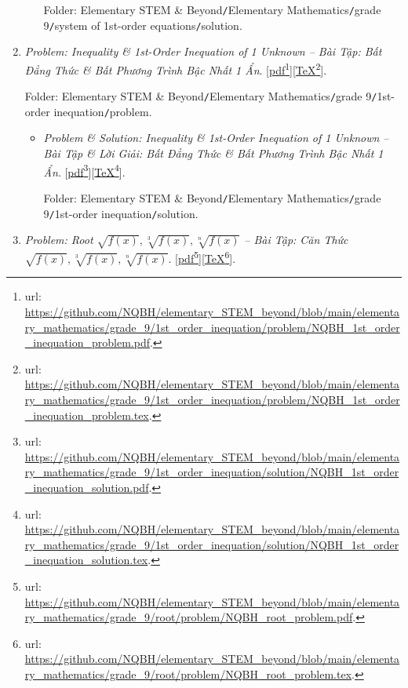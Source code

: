 \documentclass[12pt,twoside]{book}
\begin{document}
\begin{enumerate}
\begin{itemize}
		Folder: {\sf Elementary STEM \& Beyond{\tt/}Elementary Mathematics{\tt/}grade 9{\tt/}system of 1st-order equations{\tt/}solution}.
	\end{itemize}
	\item {\it Problem: Inequality \& 1st-Order Inequation of 1 Unknown -- Bài Tập: Bất Đẳng Thức \& Bất Phương Trình Bậc Nhất 1 Ẩn}. [\href{https://github.com/NQBH/elementary_STEM_beyond/blob/main/elementary_mathematics/grade_9/1st_order_inequation/problem/NQBH_1st_order_inequation_problem.pdf}{pdf}\footnote{{\sc url}: \url{https://github.com/NQBH/elementary_STEM_beyond/blob/main/elementary_mathematics/grade_9/1st_order_inequation/problem/NQBH_1st_order_inequation_problem.pdf}.}][\href{https://github.com/NQBH/elementary_STEM_beyond/blob/main/elementary_mathematics/grade_9/1st_order_inequation/problem/NQBH_1st_order_inequation_problem.tex}{\TeX}\footnote{{\sc url}: \url{https://github.com/NQBH/elementary_STEM_beyond/blob/main/elementary_mathematics/grade_9/1st_order_inequation/problem/NQBH_1st_order_inequation_problem.tex}.}].
	
	Folder: {\sf Elementary STEM \& Beyond{\tt/}Elementary Mathematics{\tt/}grade 9{\tt/}1st-order inequation{\tt/}problem}.
	\begin{itemize}
		\item {\it Problem \& Solution: Inequality \& 1st-Order Inequation of 1 Unknown -- Bài Tập \& Lời Giải: Bất Đẳng Thức \& Bất Phương Trình Bậc Nhất 1 Ẩn}. [\href{https://github.com/NQBH/elementary_STEM_beyond/blob/main/elementary_mathematics/grade_9/1st_order_inequation/solution/NQBH_1st_order_inequation_solution.pdf}{pdf}\footnote{{\sc url}: \url{https://github.com/NQBH/elementary_STEM_beyond/blob/main/elementary_mathematics/grade_9/1st_order_inequation/solution/NQBH_1st_order_inequation_solution.pdf}.}][\href{https://github.com/NQBH/elementary_STEM_beyond/blob/main/elementary_mathematics/grade_9/1st_order_inequation/solution/NQBH_1st_order_inequation_solution.tex}{\TeX}\footnote{{\sc url}: \url{https://github.com/NQBH/elementary_STEM_beyond/blob/main/elementary_mathematics/grade_9/1st_order_inequation/solution/NQBH_1st_order_inequation_solution.tex}.}].
		
		Folder: {\sf Elementary STEM \& Beyond{\tt/}Elementary Mathematics{\tt/}grade 9{\tt/}1st-order inequation{\tt/}solution}.
	\end{itemize}
	\item {\it Problem: Root $\sqrt{f(x)},\sqrt[3]{f(x)},\sqrt[n]{f(x)}$ -- Bài Tập: Căn Thức $\sqrt{f(x)},\sqrt[3]{f(x)},\sqrt[n]{f(x)}$}. [\href{https://github.com/NQBH/elementary_STEM_beyond/blob/main/elementary_mathematics/grade_9/root/problem/NQBH_root_problem.pdf}{pdf}\footnote{{\sc url}: \url{https://github.com/NQBH/elementary_STEM_beyond/blob/main/elementary_mathematics/grade_9/root/problem/NQBH_root_problem.pdf}.}][\href{https://github.com/NQBH/elementary_STEM_beyond/blob/main/elementary_mathematics/grade_9/root/problem/NQBH_root_problem.tex}{\TeX}\footnote{{\sc url}: \url{https://github.com/NQBH/elementary_STEM_beyond/blob/main/elementary_mathematics/grade_9/root/problem/NQBH_root_problem.tex}.}].
	

\end{enumerate}
\end{document}
